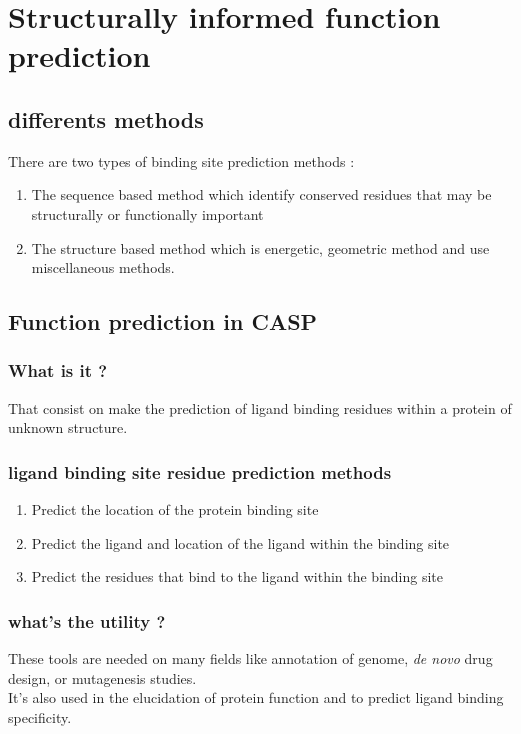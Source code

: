 \section{Structurally informed function prediction}
   \subsection{differents methods}
   
   There are two types of binding site prediction methods :
   \begin{enumerate}
     \item The sequence based method which identify conserved residues that may be structurally or functionally important
     \item The structure based method which is energetic, geometric method and use miscellaneous methods.
   \end{enumerate}

   \subsection{Function prediction in CASP}
      \subsubsection{What is it ?}
         
         That consist on make the prediction of ligand binding residues within a protein of unknown structure.
         
      \subsubsection{ligand binding site residue prediction methods}
         
         \begin{enumerate}
           \item Predict the location of the protein binding site
           \item Predict the ligand and location of the ligand within the binding site
           \item Predict the residues that bind to the ligand within the binding site
         \end{enumerate}

      \subsubsection{what's the utility ?}
         
         These tools are needed on many fields like annotation of genome, \textit{de novo} drug design, or mutagenesis studies.\\
         It's also used in the elucidation of protein function and to predict ligand binding specificity.
